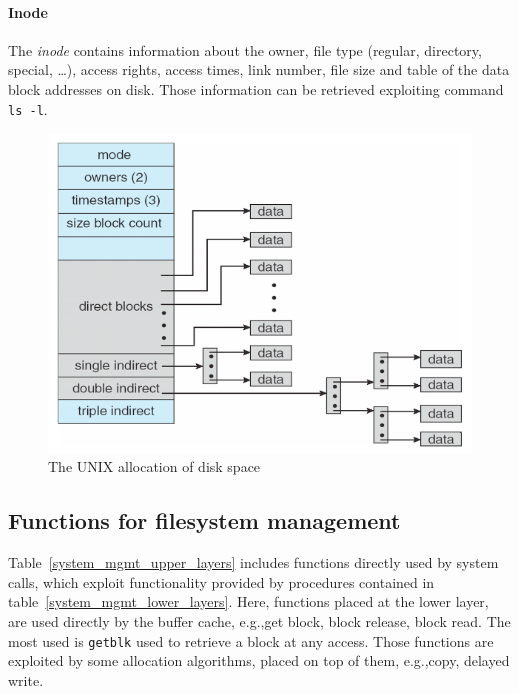 \paragraph{Inode} The \emph{inode} contains information about the owner, file type (regular, directory, special, \dots), access rights, access times, link number, file size and table of the data block addresses on disk. Those information can be retrieved exploiting command \texttt{ls -l}.

\begin{figure}[hbtp]
\centering
\includegraphics[scale=0.35]{images/file_system/unix_combined_scheme.png}
\caption{The UNIX allocation of disk space}
\end{figure}

\subsection{Functions for filesystem management}
Table~\ref{system_mgmt_upper_layers} includes functions directly used by system calls, which exploit functionality provided by procedures contained in table~\ref{system_mgmt_lower_layers}. Here, functions placed at the lower layer, are used directly by the buffer cache, e.g.,\@ get block, block release, block read. The most used is \texttt{getblk} used to retrieve a block at any access. Those functions are exploited by some allocation algorithms, placed on top of them, e.g.,\@ copy, delayed write.

